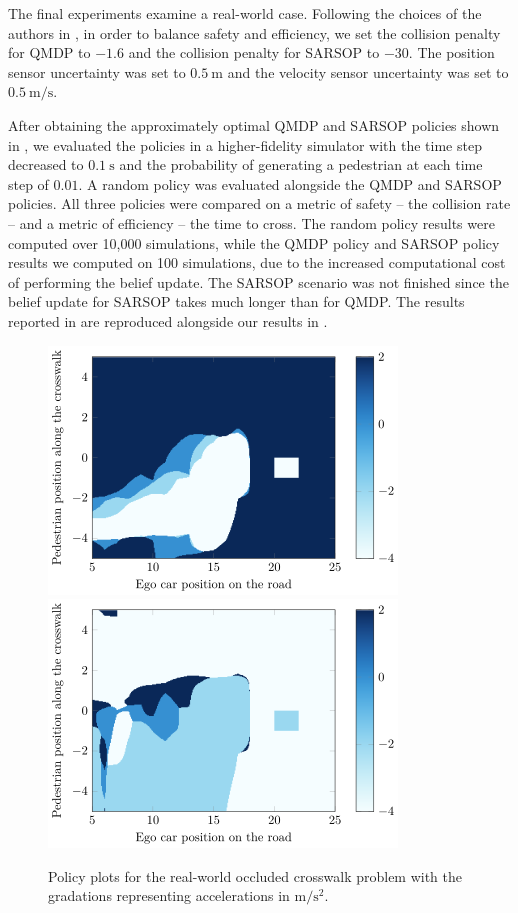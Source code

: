 \documentclass[conference]{IEEEtran}
\begin{document}
The final experiments examine a real-world case. Following the choices of the authors in \cite{Bouton2018ScalableDriving}, in order to balance safety and efficiency, we set the collision penalty for QMDP to $-1.6$ and the collision penalty for SARSOP to $-30$. The position sensor uncertainty was set to $0.5 ~\si{\meter}$ and the velocity sensor uncertainty was set to $0.5 ~\si{\meter\per\second}$.

After obtaining the approximately optimal QMDP and SARSOP policies shown in , we evaluated the policies in a higher-fidelity simulator with the time step decreased to $0.1 ~\si{\second}$ and the probability of generating a pedestrian at each time step of $0.01$. A random policy was evaluated alongside the QMDP and SARSOP policies. All three policies were compared on a metric of safety -- the collision rate -- and a metric of efficiency -- the time to cross. The random policy results were computed over 10,000 simulations, while the QMDP policy and SARSOP policy results we computed on 100 simulations, due to the increased computational cost of performing the belief update. The SARSOP scenario was not finished since the belief update for SARSOP takes much longer than for QMDP. The results reported in \cite{Bouton2018ScalableDriving} are reproduced alongside our results in .

\begin{figure}[tbph]
    \centerline{
        \includegraphics[width=0.5\linewidth]{src/plots/qmdpSIM_0_00001_noise_05.png}
        \includegraphics[width=0.5\linewidth]{src/plots/sarsopSIM_0_01_1000_noise_05.png}
    }
    \caption{Policy plots for the real-world occluded crosswalk problem with the gradations representing accelerations in $\si{\meter\per\square\second}$.}
    \label{fig:qmdp_sarsop_3}
\end{figure}
\end{document}
